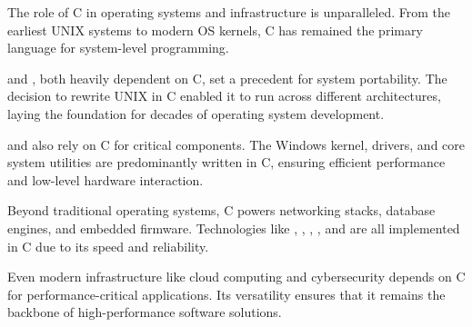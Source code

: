 \begin{NxSSSSBox}
	\begin{NxIDBox}
		The role of C in operating systems and infrastructure is unparalleled. From the earliest UNIX systems to modern OS kernels, C has remained the primary language for system-level programming.
	\end{NxIDBox}
	\begin{NxIDBox}
		 and , both heavily dependent on C, set a precedent for system portability. The decision to rewrite UNIX in C enabled it to run across different architectures, laying the foundation for decades of operating system development.
	\end{NxIDBox}
	\begin{NxIDBox}
		 and  also rely on C for critical components. The Windows kernel, drivers, and core system utilities are predominantly written in C, ensuring efficient performance and low-level hardware interaction.
	\end{NxIDBox}
	\begin{NxIDBox}
		Beyond traditional operating systems, C powers networking stacks, database engines, and embedded firmware. Technologies like , , , , and  are all implemented in C due to its speed and reliability.
	\end{NxIDBox}
	\begin{NxIDBox}
		Even modern infrastructure like cloud computing and cybersecurity depends on C for performance-critical applications. Its versatility ensures that it remains the backbone of high-performance software solutions.
	\end{NxIDBox}
\end{NxSSSSBox}

